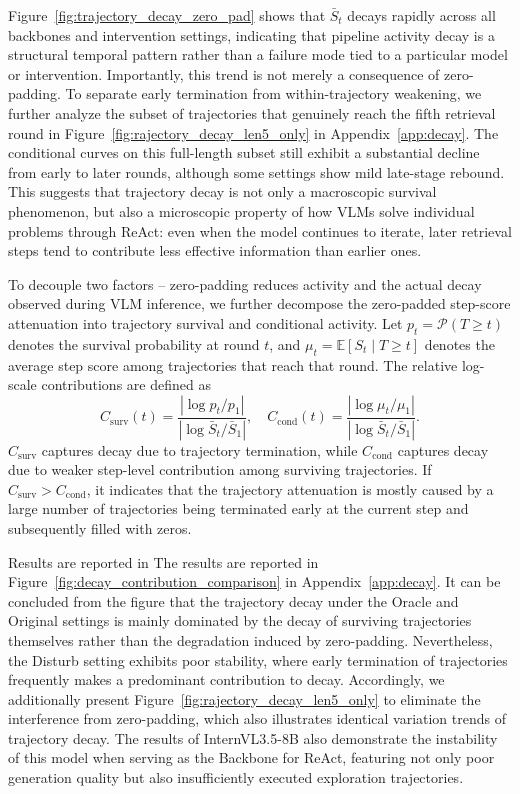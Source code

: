 \documentclass{article} %
\begin{document}
Figure~\ref{fig:trajectory_decay_zero_pad} shows that $\bar{S}_t$ decays rapidly across all backbones and intervention settings, indicating that pipeline activity decay is a structural temporal pattern rather than a failure mode tied to a particular model or intervention. Importantly, this trend is not merely a consequence of zero-padding. To separate early termination from within-trajectory weakening, we further analyze the subset of trajectories that genuinely reach the fifth retrieval round in Figure~\ref{fig:rajectory_decay_len5_only} in Appendix~\ref{app:decay}. The conditional curves on this full-length subset still exhibit a substantial decline from early to later rounds, although some settings show mild late-stage rebound. This suggests that trajectory decay is not only a macroscopic survival phenomenon, but also a microscopic property of how VLMs solve individual problems through ReAct: even when the model continues to iterate, later retrieval steps tend to contribute less effective information than earlier ones.

To decouple two factors -- zero-padding reduces activity and the actual decay observed during VLM inference, we further decompose the zero-padded step-score attenuation into trajectory survival and conditional activity. Let \(p_t=\mathcal{P}(T\ge t)\) denotes the survival probability at round \(t\), and \(\mu_t=\mathbb{E}[S_t\mid T\ge t]\) denotes the average step score among trajectories that reach that round. The relative log-scale contributions are defined as
\begin{equation}
C_{\mathrm{surv}}(t)
=
\frac{
\left|\log p_t/p_1\right|
}{
\left|\log \bar S_t/\bar S_1\right|
},
\quad
C_{\mathrm{cond}}(t)
=
\frac{
\left|\log \mu_t/\mu_1\right|
}{
\left|\log \bar S_t/\bar S_1\right|
}.
\label{eq:decay_contribution}
\end{equation}
$C_{\mathrm{surv}}$ captures decay due to trajectory termination, while $C_{\mathrm{cond}}$ captures decay due to weaker step-level contribution among surviving trajectories. If $C_{\mathrm{surv}} > C_{\mathrm{cond}}$, it indicates that the trajectory attenuation is mostly caused by a large number of trajectories being terminated early at the current step and subsequently filled with zeros.

Results are reported in The results are reported in Figure~\ref{fig:decay_contribution_comparison} in Appendix~\ref{app:decay}. It can be concluded from the figure that the trajectory decay under the Oracle and Original settings is mainly dominated by the decay of surviving trajectories themselves rather than the degradation induced by zero-padding. Nevertheless, the Disturb setting exhibits poor stability, where early termination of trajectories frequently makes a predominant contribution to decay. Accordingly, we additionally present Figure~\ref{fig:rajectory_decay_len5_only} to eliminate the interference from zero-padding, which also illustrates identical variation trends of trajectory decay. The results of InternVL3.5-8B also demonstrate the instability of this model when serving as the Backbone for ReAct, featuring not only poor generation quality but also insufficiently executed exploration trajectories.
\end{document}
